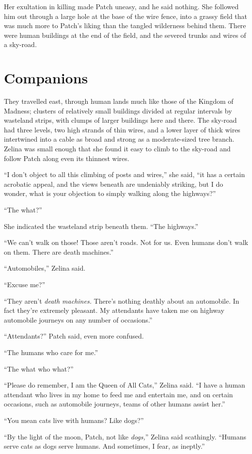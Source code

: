 \documentclass[ebook,oneside,openany,17pt]{memoir}
\renewcommand{\thechapter}{\Roman{chapter}}
\newcounter{sections}
\newcommand{\sections}[1]{%
  \section*{#1}
  \addtocounter{sections}{1}%
  \pdfbookmark[1]{#1}{section.\thechapter.\thesections}}
\begin{document}
Her exultation in killing made Patch uneasy, and he said nothing. She
followed him out through a large hole at the base of the wire fence,
into a grassy field that was much more to Patch’s liking than the
tangled wilderness behind them. There were human buildings at the end
of the field, and the severed trunks and wires of a sky-road.


\sections{Companions}

They travelled east, through human lands much like those of the
Kingdom of Madness; clusters of relatively small buildings divided at
regular intervals by wasteland strips, with clumps of larger buildings
here and there. The sky-road had three levels, two high strands of
thin wires, and a lower layer of thick wires intertwined into a cable
as broad and strong as a moderate-sized tree branch. Zelina was small
enough that she found it easy to climb to the sky-road and follow
Patch along even its thinnest wires.

“I don’t object to all this climbing of posts and wires,” she said,
“it has a certain acrobatic appeal, and the views beneath are
undeniably striking, but I do wonder, what is your objection to simply
walking along the highways?”

“The what?”

She indicated the wasteland strip beneath them. “The highways.”

“We can’t walk on those! Those aren’t roads. Not for us. Even humans
don’t walk on them. There are death machines.”

“Automobiles,” Zelina said.

“Excuse me?”

“They aren’t \emph{death machines.} There’s nothing dea\-thly about an
automobile. In fact they’re extremely pleasant. My attendants have
taken me on highway automobile journeys on any number of occasions.”

“Attendants?” Patch said, even more confused.

“The humans who care for me.”

“The what who what?”

“Please do remember, I am the Queen of All Cats,” Zelina said. “I have
a human attendant who lives in my home to feed me and entertain me,
and on certain occasions, such as automobile journeys, teams of other
humans assist her.”

“You mean cats live with humans? Like dogs?”

“By the light of the moon, Patch, not like \emph{dogs,}” Zelina said
scathingly. “Humans serve cats as dogs serve humans. And sometimes, I
fear, as ineptly.”
\end{document}
